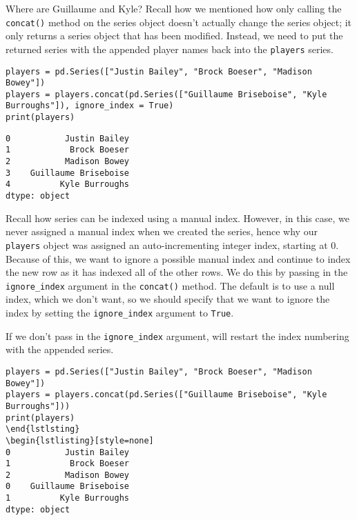 Where are Guillaume and Kyle? Recall how we mentioned how only calling the \verb|concat()| method on the series object doesn't actually change the series object; it only returns a series object that has been modified. Instead, we need to put the returned series with the appended player names back into the \verb|players| series.
\begin{lstlisting}[style=pippython]
players = pd.Series(["Justin Bailey", "Brock Boeser", "Madison Bowey"])
players = players.concat(pd.Series(["Guillaume Briseboise", "Kyle Burroughs"]), ignore_index = True)
print(players)
\end{lstlisting}
\begin{lstlisting}[style=none]
0           Justin Bailey
1            Brock Boeser
2           Madison Bowey
3    Guillaume Briseboise
4          Kyle Burroughs
dtype: object
\end{lstlisting}
Recall how series can be indexed using a manual index. However, in this case, we never assigned a manual index when we created the series, hence why our \verb|players| object was assigned an auto-incrementing integer index, starting at 0. Because of this, we want  to ignore a possible manual index and continue to index the new row as it has indexed all of the other rows. We do this by passing in the \verb|ignore_index| argument in the \verb|concat()| method. The default is to use a null index, which we don't want, so we should specify that we want to ignore the index by setting the \verb|ignore_index| argument to \verb|True|.\par
If we don't pass in the \verb|ignore_index| argument,  will restart the index numbering with the appended series.\par
\begin{lstlisting}[style=pippython]
players = pd.Series(["Justin Bailey", "Brock Boeser", "Madison Bowey"])
players = players.concat(pd.Series(["Guillaume Briseboise", "Kyle Burroughs"]))
print(players)
\end{lstlsting}
\begin{lstlisting}[style=none]
0           Justin Bailey
1            Brock Boeser
2           Madison Bowey
0    Guillaume Briseboise
1          Kyle Burroughs
dtype: object
\end{lstlisting}

